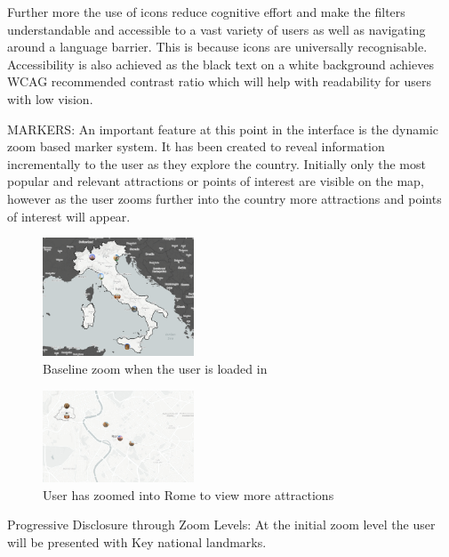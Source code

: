 \documentclass[]{project_final}
\begin{document}
Further more the use of icons reduce cognitive effort and make the filters understandable and accessible to a vast variety of users as well as navigating around a language barrier. This is because icons are universally recognisable. Accessibility is also achieved as the black text on a white background achieves WCAG recommended contrast ratio which will help with readability for users with low vision.

\newpage

MARKERS:
An important feature at this point in the interface is the dynamic zoom based marker system. It has been created to reveal information incrementally to the user as they explore the country. Initially only the most popular and relevant attractions or points of interest are visible on the map, however as the user zooms further into the country more attractions and points of interest will appear.

\begin{figure}[ht!]
    \centering
    \includegraphics[width=0.4\textwidth]{basezoom.png}
    \caption{Baseline zoom when the user is loaded in}
    \label{fig:1}
\end{figure}
\begin{figure}[ht!]
    \centering
    \includegraphics[width=0.4\textwidth]{biggerzoom.png}
    \caption{User has zoomed into Rome to view more attractions}
    \label{fig:1}
\end{figure}

Progressive Disclosure through Zoom Levels:
At the initial zoom level the user will be presented with Key national landmarks.

\end{document}
